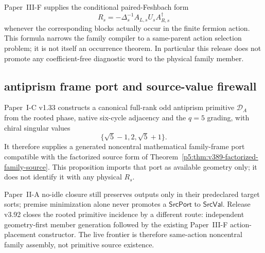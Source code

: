 \documentclass[12pt,a4paper]{article}
\begin{document}
\begin{remark}
\label{p5:rem:v390-same-parent-family-target}
Paper~III-F supplies the conditional paired-Feshbach form
\[
 R_s=-\Delta_s^{-1}A_{L,s}U_sA_{R,s}^\dagger
\]
whenever the corresponding blocks actually occur in the finite fermion
action.  This formula narrows the family compiler to a same-parent action
selection problem; it is not itself an occurrence theorem.  In particular
this release does not promote any coefficient-free diagnostic word to the
physical family member.
\end{remark}

\subsection{antiprism frame port and source-value firewall}
\label{p5:sec:v391-antiprism-frame-port}

\begin{proposition}
\label{p5:prop:v391-antiprism-frame-port}
Paper~I-C v1.33 constructs a canonical full-rank odd antiprism primitive
$\mathcal D_A$ from the rooted phase, native six-cycle adjacency and the
$q=5$ grading, with chiral singular values
\[
 \{\sqrt5-1,2,\sqrt5+1\}.
\]
It therefore supplies a generated noncentral mathematical family-frame port
compatible with the factorized source form of
Theorem~\ref{p5:thm:v389-factorized-family-source}.  This proposition imports
that port as available geometry only; it does not identify it with any
physical $R_s$.
\end{proposition}

\begin{remark}
\label{p5:rem:v391-no-cross-sort-premise-minimization}
Paper~II-A no-idle closure still preserves outputs only in their predeclared
target sorts; premise minimization alone never promotes a
$\mathsf{SrcPort}$ to $\mathsf{SrcVal}$.  Release v3.92 closes the rooted
primitive incidence by a different route: independent geometry-first member
generation followed by the existing Paper~III-F action-placement constructor.
The live frontier is therefore same-action noncentral family assembly, not
primitive source existence.
\end{remark}
\end{document}
